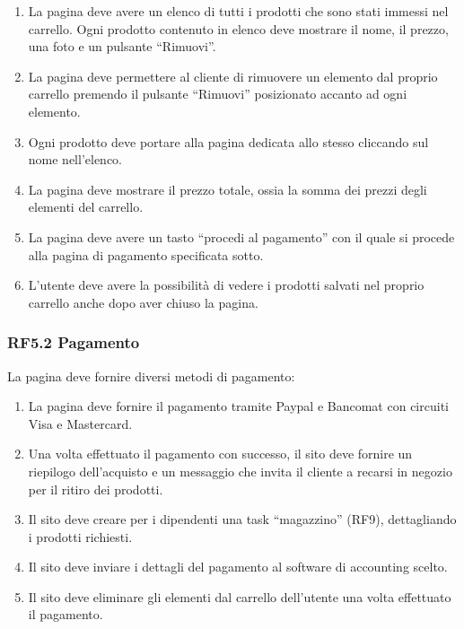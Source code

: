 \documentclass{report}
\begin{document}
\begin{enumerate}
	\item La pagina deve avere un elenco di tutti i prodotti che sono stati immessi nel carrello. Ogni prodotto contenuto in elenco deve mostrare il nome, il prezzo, una foto e un pulsante “Rimuovi”.
	
	\item La pagina deve permettere al cliente di rimuovere un elemento dal proprio carrello premendo il pulsante “Rimuovi” posizionato accanto ad ogni elemento.

	\item Ogni prodotto deve portare alla pagina dedicata allo stesso cliccando sul nome nell’elenco.
	
	\item La pagina deve mostrare il prezzo totale, ossia la somma dei prezzi degli elementi del carrello.

	\item La pagina deve avere un tasto “procedi al pagamento” con il quale si procede alla pagina di pagamento specificata sotto.
	
	\item L'utente deve avere la possibilità di vedere i prodotti salvati nel proprio carrello anche dopo aver chiuso la pagina.

\end{enumerate}

\subsubsection*{RF5.2 Pagamento}
La pagina deve fornire diversi metodi di pagamento:

\begin{enumerate}

	\item La pagina deve fornire il pagamento tramite Paypal e Bancomat con circuiti Visa e Mastercard.

	\item Una volta effettuato il pagamento con successo, il sito deve fornire un riepilogo dell’acquisto e un messaggio che invita il cliente a recarsi in negozio per il ritiro dei prodotti.
	\item Il sito deve creare per i dipendenti una task “magazzino” (RF9), dettagliando i prodotti richiesti.
	\item Il sito deve inviare i dettagli del pagamento al software di accounting scelto.
	\item Il sito deve eliminare gli elementi dal carrello dell’utente una volta effettuato il pagamento.
\end{enumerate}
\end{document}
